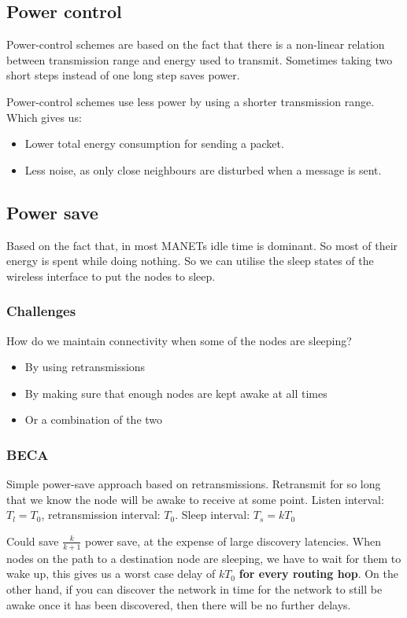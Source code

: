 	\subsection{Power control}
	Power-control schemes are based on the fact that there is a non-linear relation between transmission range and energy used to transmit. Sometimes taking two short steps instead of one long step saves power.
	
	Power-control schemes use less power by using a shorter transmission range. Which gives us:
	\begin{itemize}
		\item Lower total energy consumption for sending a packet.
		\item Less noise, as only close neighbours are disturbed when a message is sent.
	\end{itemize}
	
	\subsection{Power save}
	Based on the fact that, in most \glspl{MANET} idle time is dominant. So most of their energy is spent while doing nothing. So we can utilise the sleep states of the wireless interface to put the nodes to sleep.
	
	\subsubsection{Challenges}
	How do we maintain connectivity when some of the nodes are sleeping?
	\begin{itemize}
		\item By using retransmissions
		\item By making sure that enough nodes are kept awake at all times
		\item Or a combination of the two
	\end{itemize}
	
	\subsubsection{BECA}
	Simple power-save approach based on retransmissions. Retransmit for so long that we know the node will be awake to receive at some point. Listen interval: $T_l = T_0$, retransmission interval: $T_0$. Sleep interval: $T_s = kT_0$
	
	Could save $\frac{k}{k+1}$ power save, at the expense of large discovery latencies. When nodes on the path to a destination node are sleeping, we have to wait for them to wake up, this gives us a worst case delay of $kT_0$ \textbf{for every routing hop}. On the other hand, if you can discover the network in time for the network to still be awake once it has been discovered, then there will be no further delays.
	
